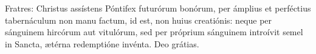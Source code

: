 Fratres: Christus assístens Póntifex futurórum bonórum, per ámplius et perféctius tabernáculum non manu factum, id est, non huius creatiónis: neque per sánguinem hircórum aut vitulórum, sed per próprium sánguinem introívit semel in Sancta, ætérna redemptióne invénta. \rubric{\Rbar} Deo grátias.
